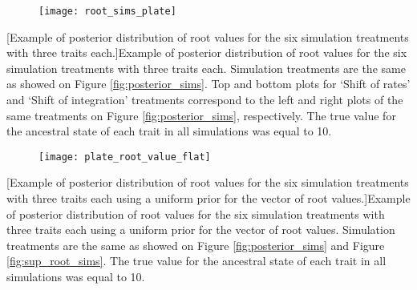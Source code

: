 \begin{figure}[h]
	\centering
	\texttt{[image: root\_sims\_plate]}
\end{figure}
\clearpage %
[Example of posterior distribution of root values for the six simulation treatments with three traits each.]{Example of posterior distribution of root values for the six simulation treatments with three traits each. Simulation treatments are the same as showed on Figure \ref{fig:posterior_sims}. Top and bottom plots for `Shift of rates' and `Shift of integration' treatments correspond to the left and right plots of the same treatments on Figure \ref{fig:posterior_sims}, respectively. The true value for the ancestral state of each trait in all simulations was equal to 10.}
\label{fig:sup_root_sims}

\begin{figure}[h]
	\centering
	\texttt{[image: plate\_root\_value\_flat]}
\end{figure}
\clearpage %
[Example of posterior distribution of root values for the six simulation treatments with three traits each using a uniform prior for the vector of root values.]{Example of posterior distribution of root values for the six simulation treatments with three traits each using a uniform prior for the vector of root values. Simulation treatments are the same as showed on Figure \ref{fig:posterior_sims} and Figure \ref{fig:sup_root_sims}. The true value for the ancestral state of each trait in all simulations was equal to 10.}
\label{fig:sup_root_sims_flat}


